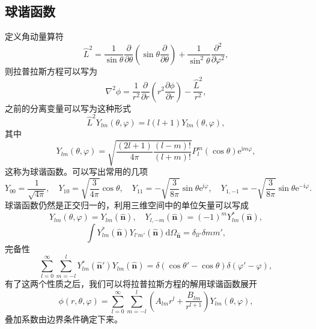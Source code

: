\documentclass[UTF8]{ctexbook}
\newcommand{\e}{\mathrm{e}}
\renewcommand{\d}{\mathrm{d}}
\renewcommand{\b}{\boldsymbol}
\renewcommand{\i}{\mathrm{i}}
\numberwithin{equation}{chapter}
\begin{document}
	\subsection{球谐函数}
	定义角动量算符
	\[\hat{L}^2=\frac{1}{\sin\theta}\frac{\partial }{\partial \theta}\left(\sin\theta\frac{\partial }{\partial \theta}\right)+\frac{1}{\sin^2\theta}\frac{\partial^2}{\partial \varphi^2},\]
	则拉普拉斯方程可以写为
	\[\nabla^2\phi=\frac{1}{r^2}\frac{\partial }{\partial r}\left(r^2\frac{\partial \phi}{\partial r}\right)-\frac{\hat{L}^2}{r^2},\]
	之前的分离变量可以写为这种形式
	\[\hat{L}^2 Y_{lm}(\theta,\varphi)=l(l+1)Y_{lm}(\theta,\varphi),\]
	其中
	\[Y_{lm}(\theta,\varphi)=\sqrt{\frac{(2l+1)}{4\pi}\frac{(l-m)!}{(l+m)!}}P_l^m(\cos\theta)\e^{\i m\varphi},\]
	这称为球谐函数。可以写出常用的几项
	\[Y_{00}=\frac{1}{\sqrt{4\pi}},\quad Y_{10}=\sqrt{\frac{3}{4\pi}}\cos\theta,\quad Y_{11}=-\sqrt{\frac{3}{8\pi}}\sin\theta\e^{\i \varphi},\quad Y_{1,-1}=-\sqrt{\frac{3}{8\pi}}\sin\theta\e^{-\i \varphi}.\]
	球谐函数仍然是正交归一的，利用三维空间中的单位矢量可以写成
	\[Y_{lm}(\theta,\varphi)=Y_{lm}(\hat{\b{n}}),\quad Y_{l,-m}(\hat{\b{n}})=(-1)^m Y_{lm}^*(\hat{\b{n}}),\]
	\[\int Y_{lm}^*(\hat{\b{n}})Y_{l'm'}(\hat{\b{n}})\d \Omega_{\hat{\b{n}}}=\delta_{ll'}\delta{mm'},\]
	完备性
	\[\sum_{l=0}^\infty \sum_{m=-l}^l Y_{lm}^*(\hat{\b{n}}')Y_{lm}(\hat{\b{n}})=\delta(\cos\theta'-\cos\theta)\delta(\varphi'-\varphi),\]
	有了这两个性质之后，我们可以将拉普拉斯方程的解用球谐函数展开
	\[\phi(r,\theta,\varphi)=\sum_{l=0}^\infty\sum_{m=-l}^l \left(A_{lm}r^l+\frac{B_{lm}}{r^{l+1}}\right)Y_{lm}(\theta,\varphi),\]
	叠加系数由边界条件确定下来。
	
\end{document}
